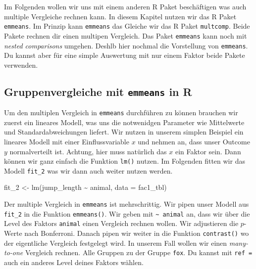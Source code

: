 \documentclass[
  letterpaper,
]{scrbook}
\newenvironment{Shaded}{\begin{snugshade}}{\end{snugshade}}
\newcommand{\AttributeTok}[1]{\textcolor[rgb]{0.40,0.45,0.13}{#1}}
\newcommand{\FunctionTok}[1]{\textcolor[rgb]{0.28,0.35,0.67}{#1}}
\newcommand{\NormalTok}[1]{\textcolor[rgb]{0.00,0.23,0.31}{#1}}
\newcommand{\OtherTok}[1]{\textcolor[rgb]{0.00,0.23,0.31}{#1}}
\newcommand{\SpecialCharTok}[1]{\textcolor[rgb]{0.37,0.37,0.37}{#1}}
\begin{document}
Im Folgenden wollen wir uns mit einem anderen R Paket beschäftigen was
auch multiple Vergleiche rechnen kann. In diesem Kapitel nutzen wir das
R Paket \texttt{emmeans}. Im Prinzip kann \texttt{emmeans} das Gleiche
wir das R Paket \texttt{multcomp}. Beide Pakete rechnen dir einen
multipen Vergleich. Das Paket \texttt{emmeans} kann noch mit
\emph{nested comparisons} umgehen. Deshlb hier nochmal die Vorstellung
von \texttt{emmeans}. Du kannst aber für eine simple Auswertung mit nur
einem Faktor beide Pakete verwenden.

\hypertarget{gruppenvergleiche-mit-emmeans-in-r}{%
\subsection{\texorpdfstring{Gruppenvergleiche mit \texttt{emmeans} in
R}{Gruppenvergleiche mit emmeans in R}}\label{gruppenvergleiche-mit-emmeans-in-r}}


Um den multiplen Vergleich in \texttt{emmeans} durchführen zu können
brauchen wir zuerst ein lineares Modell, was uns die notwenidgen
Parameter wie Mittelwerte und Standardabweichungen liefert. Wir nutzen
in unserem simplen Beispiel ein lineares Modell mit einer
Einflussvariable \(x\) und nehmen an, dass unser Outcome \(y\)
normalverteilt ist. Achtung, hier muss natürlich das \(x\) ein Faktor
sein. Dann können wir ganz einfach die Funktion \texttt{lm()} nutzen. Im
Folgenden fitten wir das Modell \texttt{fit\_2} was wir dann auch weiter
nutzen werden.

\begin{Shaded}
\begin{Highlighting}[]
\NormalTok{fit\_2 }\OtherTok{\textless{}{-}} \FunctionTok{lm}\NormalTok{(jump\_length }\SpecialCharTok{\textasciitilde{}}\NormalTok{ animal, }\AttributeTok{data =}\NormalTok{ fac1\_tbl)}
\end{Highlighting}
\end{Shaded}

Der multiple Vergleich in \texttt{emmeans} ist mehrschrittig. Wir pipen
unser Modell aus \texttt{fit\_2} in die Funktion \texttt{emmeans()}. Wir
geben mit \texttt{\textasciitilde{}\ animal} an, dass wir über die Level
des Faktors \texttt{animal} einen Vergleich rechnen wollen. Wir
adjustieren die \(p\)-Werte nach Bonferroni. Danach pipen wir weiter in
die Funktion \texttt{contrast()} wo der eigentliche Vergleich festgelegt
wird. In unserem Fall wollen wir einen \emph{many-to-one} Vergleich
rechnen. Alle Gruppen zu der Gruppe \texttt{fox}. Du kannst mit
\texttt{ref\ =} auch ein anderes Level deines Faktors wählen.
\end{document}

